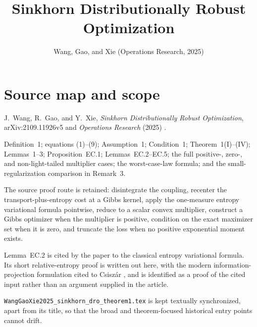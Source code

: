 
\title{Sinkhorn Distributionally Robust Optimization}
\author{}
\date{Wang, Gao, and Xie (Operations Research, 2025)}

\maketitle

\section*{Source map and scope}
\begin{sourceguide}
\item[Primary source] J.~Wang, R.~Gao, and Y.~Xie, \emph{Sinkhorn Distributionally Robust Optimization}, arXiv:2109.11926v5 and \emph{Operations Research} (2025) \cite{WangGaoXie2025}.
\item[Coverage] Definition~1; equations (1)--(9); Assumption~1; Condition~1; Theorem~1(I)--(IV); Lemmas~1--3; Proposition~EC.1; Lemmas~EC.2--EC.5; the full positive-, zero-, and non-light-tailed multiplier cases; the worst-case-law formula; and the small-regularization comparison in Remark~3.
\item[Method] The source proof route is retained: disintegrate the coupling, recenter the transport-plus-entropy cost at a Gibbs kernel, apply the one-measure entropy variational formula pointwise, reduce to a scalar convex multiplier, construct a Gibbs optimizer when the multiplier is positive, condition on the exact maximizer set when it is zero, and truncate the loss when no positive exponential moment exists.
\item[Supplemental detail] Lemma~EC.2 is cited by the paper to the classical entropy variational formula.  Its short relative-entropy proof is written out here, with the modern information-projection formulation cited to Csisz\'ar \cite{Csiszar1975}, and is identified as a proof of the cited input rather than an argument supplied in the article.
\item[Companion note] \texttt{WangGaoXie2025\_sinkhorn\_dro\_theorem1.tex} is kept textually synchronized, apart from its title, so that the broad and theorem-focused historical entry points cannot drift.
\end{sourceguide}

